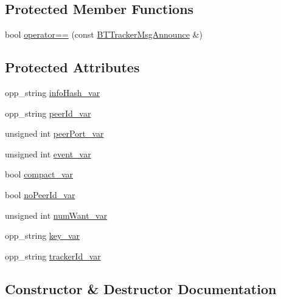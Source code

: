 \subsection*{Protected Member Functions}
\begin{DoxyCompactItemize}
\item 
bool \hyperlink{classBTTrackerMsgAnnounce_acbea02450b6e264303f713edcaa64b97}{operator==} (const \hyperlink{classBTTrackerMsgAnnounce}{B\+T\+Tracker\+Msg\+Announce} \&)
\end{DoxyCompactItemize}
\subsection*{Protected Attributes}
\begin{DoxyCompactItemize}
\item 
opp\+\_\+string \hyperlink{classBTTrackerMsgAnnounce_af774e44908377e324fd25e16a048c184}{info\+Hash\+\_\+var}
\item 
opp\+\_\+string \hyperlink{classBTTrackerMsgAnnounce_afdb278a71653823706ad6b925a03711e}{peer\+Id\+\_\+var}
\item 
unsigned int \hyperlink{classBTTrackerMsgAnnounce_a8284aedb73866bde651c42c6faf6b486}{peer\+Port\+\_\+var}
\item 
unsigned int \hyperlink{classBTTrackerMsgAnnounce_acbbb1522bc659a2972e7b73eaa201df2}{event\+\_\+var}
\item 
bool \hyperlink{classBTTrackerMsgAnnounce_a22ee38ffb1718174a7684bdb13200e24}{compact\+\_\+var}
\item 
bool \hyperlink{classBTTrackerMsgAnnounce_a3e10bd3398780f6490f349d749e0e578}{no\+Peer\+Id\+\_\+var}
\item 
unsigned int \hyperlink{classBTTrackerMsgAnnounce_a080f57e3a09c716d69410dcf0d62a705}{num\+Want\+\_\+var}
\item 
opp\+\_\+string \hyperlink{classBTTrackerMsgAnnounce_abaf4cc9b3fd1ab417d370b72d65e5420}{key\+\_\+var}
\item 
opp\+\_\+string \hyperlink{classBTTrackerMsgAnnounce_a1353228205f838d4de9c6e22bb2a6573}{tracker\+Id\+\_\+var}
\end{DoxyCompactItemize}


\subsection{Constructor \& Destructor Documentation}
\hypertarget{classBTTrackerMsgAnnounce_a006351da6f99e4f73785cad49b5aecfa}{}
